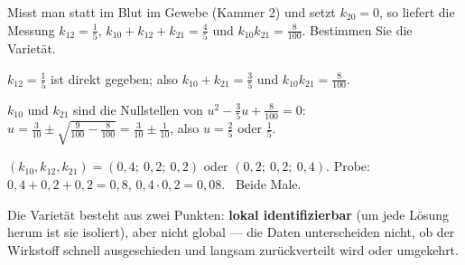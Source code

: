 \begin{aufgabe}
Misst man statt im Blut im Gewebe (Kammer 2) und setzt $k_{20} = 0$, so liefert die Messung $k_{12} = \tfrac15$, $k_{10} + k_{12} + k_{21} = \tfrac45$ und $k_{10}k_{21} = \tfrac{8}{100}$. Bestimmen Sie die Varietät.

\loesung
{}
$k_{12} = \tfrac15$ ist direkt gegeben; also $k_{10} + k_{21} = \tfrac35$ und $k_{10}k_{21} = \tfrac{8}{100}$.

$k_{10}$ und $k_{21}$ sind die Nullstellen von $u^{2} - \tfrac35u + \tfrac{8}{100} = 0$: $u = \tfrac{3}{10}\pm\sqrt{\tfrac{9}{100} - \tfrac{8}{100}} = \tfrac{3}{10}\pm\tfrac{1}{10}$, also $u = \tfrac25$ oder $\tfrac15$.

$(k_{10}, k_{12}, k_{21}) = (0{,}4;\ 0{,}2;\ 0{,}2)$ oder $(0{,}2;\ 0{,}2;\ 0{,}4)$. Probe: $0{,}4 + 0{,}2 + 0{,}2 = 0{,}8$, $0{,}4\cdot0{,}2 = 0{,}08$. \checkmark\ Beide Male.

Die Varietät besteht aus zwei Punkten: \textbf{lokal identifizierbar} (um jede Lösung herum ist sie isoliert), aber nicht global --- die Daten unterscheiden nicht, ob der Wirkstoff schnell ausgeschieden und langsam zurückverteilt wird oder umgekehrt.

\begin{center}
\begin{minipage}{0.88\textwidth}
\end{minipage}
\end{center}
\end{aufgabe}


